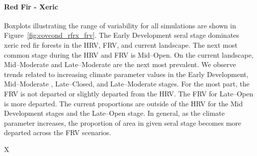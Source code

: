 \paragraph*{Red Fir - Xeric} 
Boxplots illustrating the range of variability for all simulations are shown in Figure~\ref{fig:covcond_rfrx_frv}. The Early Development seral stage dominates xeric red fir forests in the HRV, FRV, and current landscape. The next most common stage during the HRV and FRV is Mid--Open. On the current landscape, Mid--Moderate and Late--Moderate are the next most prevalent. We observe trends related to increasing climate parameter values in the Early Development, Mid--Moderate , Late--Closed, and Late--Moderate stages. For the most part, the FRV is not departed or slightly departed from the HRV. The FRV for Late--Open is more departed. The current proportions are outside of the HRV for the Mid Development stages and the Late--Open stage. In general, as the climate parameter increases, the proportion of area in given seral stage becomes more departed across the FRV scenarios.

X%


